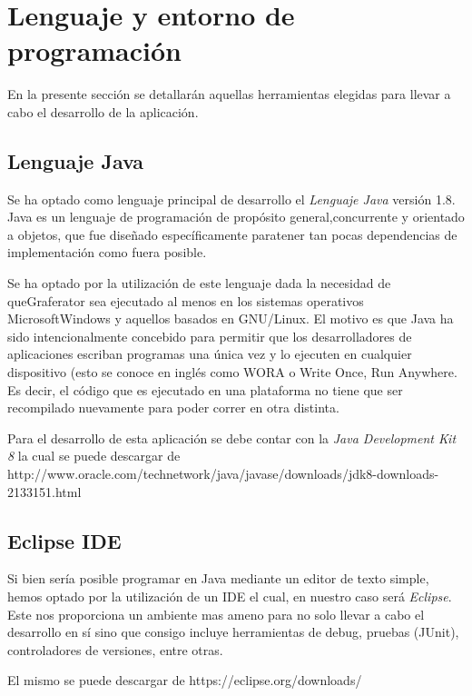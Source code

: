 \documentclass{book}
\begin{document}
\section{Lenguaje y entorno de programación}

En la presente sección se detallarán aquellas herramientas elegidas para llevar a cabo el desarrollo de la aplicación. 
\bigskip


\subsection{Lenguaje Java}

Se ha optado como lenguaje principal de desarrollo el \textit{Lenguaje Java} versión 1.8. Java es un lenguaje de programación de propósito general,concurrente y orientado a objetos, que fue diseñado específicamente paratener tan pocas dependencias de implementación como fuera posible.
\par
Se ha optado por la utilización de este lenguaje dada la necesidad de queGraferator sea ejecutado al menos en los sistemas operativos MicrosoftWindows y aquellos basados en GNU/Linux. El motivo es que Java ha sido intencionalmente concebido para permitir que los desarrolladores de  aplicaciones escriban programas una única vez y lo ejecuten en cualquier dispositivo (esto se conoce en inglés como WORA o Write Once, Run Anywhere. Es decir, el código que es ejecutado en una plataforma no tiene que ser recompilado nuevamente para poder correr en otra distinta.
\par
Para el desarrollo de esta aplicación se debe contar con la \textit{Java Development Kit 8} la cual se puede descargar de http://www.oracle.com/technetwork/java/javase/downloads/jdk8-downloads-2133151.html
\medskip


\subsection{Eclipse IDE}

Si bien sería posible programar en Java mediante un editor de texto simple, hemos optado por la utilización de un IDE el cual, en nuestro caso será \textit{Eclipse}. Este nos proporciona un ambiente mas ameno para no solo llevar a cabo el desarrollo en sí sino que consigo incluye herramientas de debug, pruebas (JUnit), controladores de versiones, entre otras.
\par
El mismo se puede descargar de https://eclipse.org/downloads/
\medskip
\end{document}
